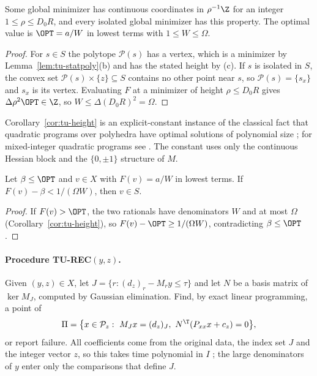 \begin{corollary}\label{cor:tu-height}
Some global minimizer has continuous coordinates in $\rho^{-1}\Z$ for an
integer $1\le\rho\le D_0R$, and every isolated global minimizer has this
property. The optimal value is $\OPT=a/W$ in lowest terms with $1\le W\le\Omega$.
\end{corollary}

\begin{proof}
For $s\in S$ the polytope $\mathcal P(s)$ has a vertex, which is a minimizer by
Lemma~\ref{lem:tu-statpoly}(b) and has the stated height by (c). If $s$ is
isolated in $S$, the convex set $\mathcal P(s)\times\{z\}\subseteq S$ contains
no other point near $s$, so $\mathcal P(s)=\{s_x\}$ and $s_x$ is its vertex.
Evaluating $F$ at a minimizer of height $\rho\le D_0R$ gives
$\Delta\rho^2\OPT\in\Z$, so $W\le\Delta(D_0R)^2=\Omega$.
\end{proof}

Corollary~\ref{cor:tu-height} is an explicit-constant instance of the
classical fact that quadratic programs over polyhedra have optimal solutions
of polynomial size \cite{Vavasis1990}; for mixed-integer quadratic programs see
\cite{DelPiaDeyMolinaro2017}. The constant uses only the continuous Hessian
block and the $\{0,\pm1\}$ structure of $M$.

\begin{proposition}\label{prop:tu-accept}
Let $\beta\le\OPT$ and $v\in X$ with $F(v)=a/W$ in lowest terms. If
$F(v)-\beta<1/(\Omega W)$, then $v\in S$.
\end{proposition}

\begin{proof}
If $F(v)>\OPT$, the two rationals have denominators $W$ and at most $\Omega$
(Corollary~\ref{cor:tu-height}), so $F(v)-\OPT\ge1/(\Omega W)$, contradicting
$\beta\le\OPT$.
\end{proof}

\paragraph{Procedure TU-REC$(y,z)$.}
Given $(y,z)\in X$, let $J=\{r:(d_z)_r-M_ry\le\tau\}$ and let $N$ be a basis
matrix of $\ker M_J$, computed by Gaussian elimination. Find, by exact linear
programming, a point of
\[
\Pi=\bigl\{x\in\mathcal P_z:\ M_Jx=(d_z)_J,\ N^{\T}(P_{xx}x+c_z)=0\bigr\},
\]
or report failure. All coefficients come from the original data, the index
set $J$ and the integer vector $z$, so this takes time polynomial in $I$
\cite{GrotschelLovaszSchrijver1988}; the large denominators of
$y$ enter only the comparisons that define $J$.

